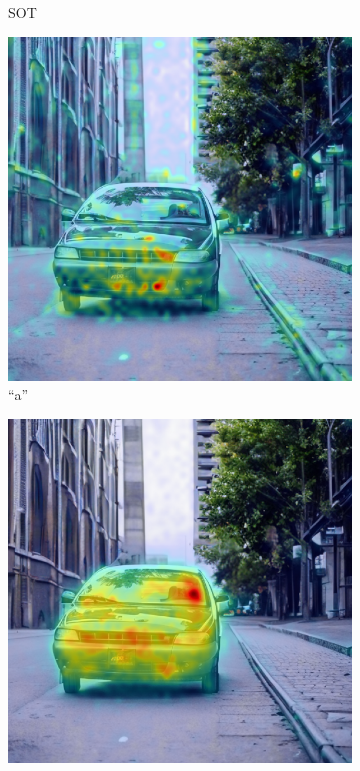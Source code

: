 \begin{figure}
\begin{subfigure}{0.32\columnwidth}
   \caption{\textlangle SOT\textrangle}
   \label{fig:daam-example-image-1}
  \end{subfigure}
  \begin{subfigure}{0.32\columnwidth}
   \includegraphics[width=\columnwidth]{img/3-methodology/example_daam_heatmap_a.png}
   \caption{``a''}
   \label{fig:daam-example-image-2}
  \end{subfigure}
  \par\bigskip
  \begin{subfigure}{0.32\columnwidth}
   \includegraphics[width=\columnwidth]{img/3-methodology/example_daam_heatmap_car.png}

\end{subfigure}
\end{figure}
